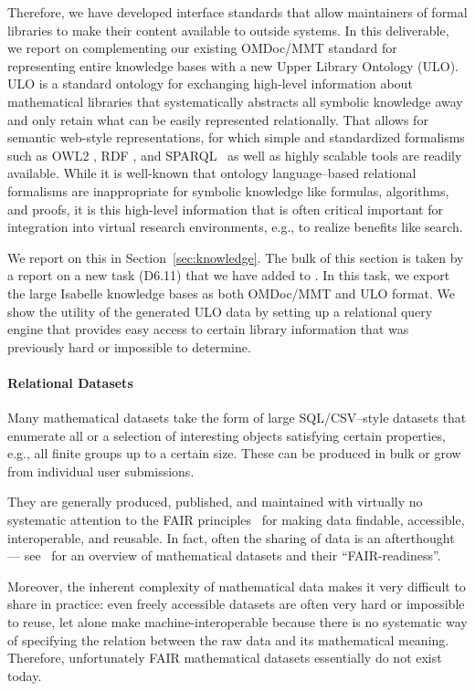 Therefore, we have developed interface standards that allow maintainers of formal libraries to make their content available to outside systems.
In this deliverable, we report on complementing our existing OMDoc/MMT standard for representing entire knowledge bases with a new Upper Library Ontology (ULO).
ULO is a standard ontology for exchanging high-level information about mathematical libraries that systematically abstracts all symbolic knowledge away and only retain what can be easily represented relationally.
That allows for semantic web-style representations, for which simple and standardized formalisms such as OWL2 \cite{w3c:owl2-xml}, RDF \cite{rdf}, and SPARQL~\cite{w3c:SPARQL-Rec:13} as well as highly scalable tools are readily available.
While it is well-known that ontology language--based relational formalisms are inappropriate for symbolic knowledge like formulas, algorithms, and proofs, it is this high-level information that is often critical important for integration into virtual research environments, e.g., to realize benefits like search.

We report on this in Section~\ref{sec:knowledge}.
The bulk of this section is taken by a report on a new task (D6.11)  that we have added to \pn.
In this task, we export the large Isabelle knowledge bases  as both OMDoc/MMT and ULO format.
We show the utility of the generated ULO data by setting up a relational query engine that provides easy access to certain library information that was previously hard or impossible to determine.

\paragraph{Relational Datasets}
Many mathematical datasets take the form of large SQL/CSV--style datasets that enumerate all or a selection of interesting objects satisfying certain properties, e.g., all finite groups up to a certain size.
These can be produced in bulk or grow from individual user submissions.

They are generally produced, published, and maintained with virtually no systematic attention to the FAIR principles~\cite{FAIR,WilDumAal:FAIR16} for making data findable, accessible, interoperable, and reusable.
In fact, often the sharing of data is an afterthought --- see~\cite{Bercic:cmo:wiki} for an overview of mathematical datasets and their ``FAIR-readiness''.

Moreover, the inherent complexity of mathematical data makes it very difficult to share in practice: even freely accessible datasets are often very hard or impossible to reuse, let alone make machine-interoperable because there is no systematic way of specifying the relation between the raw data and its mathematical meaning. 
Therefore, unfortunately FAIR mathematical datasets essentially do not exist today.

